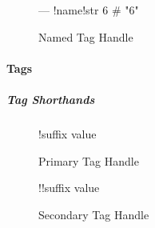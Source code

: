 \begin{figure}[H]
  \begin{minipage}[t]{0.48\textwidth}
    \vspace{0pt}
    \begin{bchart}[max=9, width=0.85\textwidth]
    \end{bchart}
  \end{minipage}
  \begin{minipage}[t]{0.48\textwidth}
    \vspace{0pt}
    \begin{yamlcode}
      ---
      !name!str 6 # "6"
    \end{yamlcode}
  \end{minipage}
  \caption{Named Tag Handle}
\end{figure}

\paragraph{Tags}

\subparagraph{Tag Shorthands}

\begin{figure}[H]
  \begin{minipage}[t]{0.48\textwidth}
    \vspace{0pt}
    \begin{bchart}[max=9, width=0.85\textwidth]
      \bcxlabel{}
    \end{bchart}
  \end{minipage}
  \begin{minipage}[t]{0.48\textwidth}
    \vspace{0pt}
    \begin{yamlcode}
      !suffix value
    \end{yamlcode}
  \end{minipage}
  \caption{Primary Tag Handle}
\end{figure}

\begin{figure}[H]
  \begin{minipage}[t]{0.48\textwidth}
    \vspace{0pt}
    \begin{bchart}[max=9, width=0.85\textwidth]
    \end{bchart}
  \end{minipage}
  \begin{minipage}[t]{0.48\textwidth}
    \vspace{0pt}
    \begin{yamlcode}
      !!suffix value
    \end{yamlcode}
  \end{minipage}
  \caption{Secondary Tag Handle}
\end{figure}

